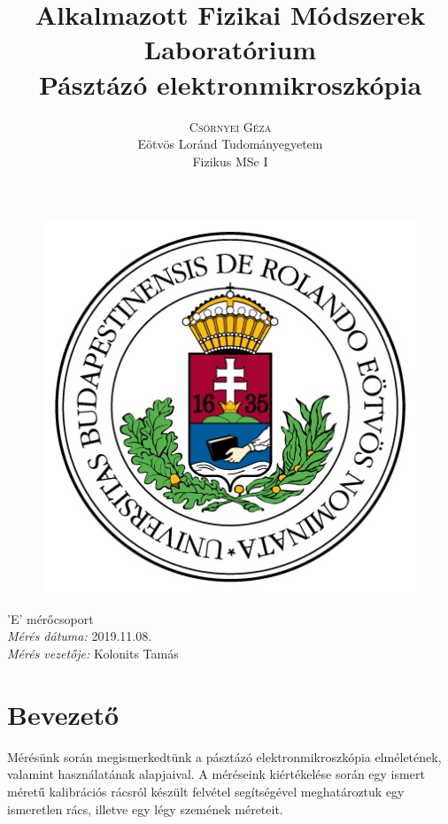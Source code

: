 \documentclass[12pt,a4paper]{article}
\title{\huge{Alkalmazott Fizikai Módszerek Laboratórium}\\ \vspace{20pt}
\textbf{Pásztázó elektronmikroszkópia}}
\author{\Large{\textsc{Csörnyei Géza}} \vspace{10pt}\\
	\textrm{Eötvös Loránd Tudományegyetem}\\
	\textrm{Fizikus MSc I}
	}
\date{}
\begin{document}
\addtolength{\voffset}{-1.0cm}
\addtolength{\textheight}{1.0cm}
\begin{titlepage}
\maketitle

\begin{figure}[!htb]
\centering
\includegraphics[scale=0.6]{eltecimer.jpg}
\end{figure}

\hfil \Large{'E' mérőcsoport}\hfil  \\
\vspace*{2pt}
\hfil \Large{\emph{Mérés dátuma:} 2019.11.08.}\hfil \\
\vspace*{2pt}
\hfil \hspace*{45pt} \Large{\emph{Mérés vezetője:} Kolonits Tamás}\hfil
\thispagestyle{empty}
\end{titlepage}


\section{Bevezető}
\hspace{10pt} Mérésünk során megismerkedtünk a pásztázó elektronmikroszkópia elméletének, valamint használatának alapjaival. A méréseink kiértékelése során egy ismert méretű kalibrációs rácsról készült felvétel segítségével meghatároztuk egy ismeretlen rács, illetve egy légy szemének méreteit.
\end{document}
